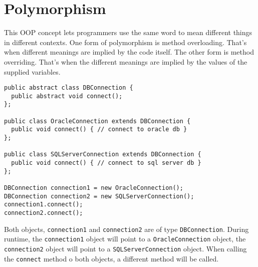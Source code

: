 \section{Polymorphism}
This OOP concept lets programmers use the same word to mean
different things in different contexts. One form of polymorphism
is method overloading. That's when different meanings are implied
by the code itself. The other form is method overriding. That's when
the different meanings are implied by the values of the supplied
variables.

\begin{lstlisting}
public abstract class DBConnection {
  public abstract void connect();
};

public class OracleConnection extends DBConnection {
  public void connect() { // connect to oracle db }
};

public class SQLServerConnection extends DBConnection {
  public void connect() { // connect to sql server db }
};

DBConnection connection1 = new OracleConnection();
DBConnection connection2 = new SQLServerConnection();
connection1.connect();
connection2.connect();
\end{lstlisting}

Both objects, \verb|connection1| and \verb|connection2| are of
type \verb|DBConnection|. During runtime, the \verb|connection1| object
will point to a \verb|OracleConnection| object, the
\verb|connection2| object will point to a \verb|SQLServerConnection| object.
When calling the \verb|connect| method o both objects, a different method
will be called.

